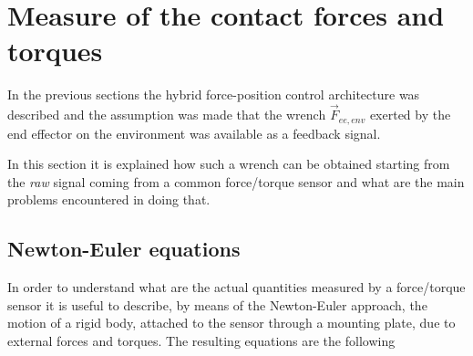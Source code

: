 \section{Measure of the contact forces and torques}
In the previous sections the hybrid force-position control architecture was described
and the assumption was made that the wrench $\vec{F}_{ee, env}$ exerted by the end effector on the environment
was available as a feedback signal.
\par
In this section it is explained how such a wrench can be obtained starting from the \emph{raw} signal
coming from a common force/torque sensor and what are the main problems encountered in doing that.

\subsection{Newton-Euler equations}
In order to understand what are the actual quantities measured by a force/torque sensor it is useful
to describe, by means of the Newton-Euler approach, the motion of a rigid body, attached to the
sensor through a mounting plate, due to external forces and torques. The resulting equations are the following

